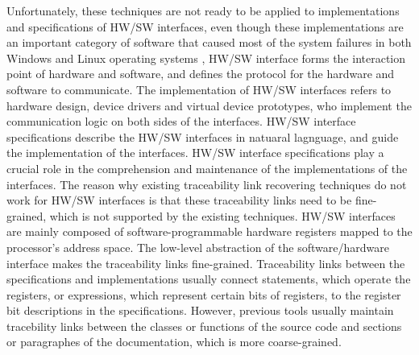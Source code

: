 Unfortunately, these techniques are not ready to be applied to implementations and specifications of HW/SW interfaces,
even though these implementations are an important category of software that caused most of the system failures in both Windows and Linux operating systems \cite{swift_os_2003} \cite{chou_os_2001},
HW/SW interface forms the interaction point of hardware and software,
and defines the protocol for the hardware and software to communicate.
The implementation of HW/SW interfaces refers to hardware design, device drivers and virtual device prototypes, who implement the communication logic on both sides of the interfaces.
HW/SW interface specifications describe the HW/SW interfaces in natuaral lagnguage,
and guide the implementation of the interfaces.
HW/SW interface specifications play a crucial role in the comprehension and maintenance of the implementations of the interfaces.
The reason why existing traceability link recovering techniques do not work for HW/SW interfaces is that these traceability links need to be fine-grained,
which is not supported by the existing techniques.
HW/SW interfaces are mainly composed of software-programmable hardware registers mapped to the processor's address space.
The low-level abstraction of the software/hardware interface makes the traceability links fine-grained.
Traceability links between the specifications and implementations usually connect statements, which operate the registers, or expressions, which represent certain bits of registers, to the register bit descriptions in the specifications. 
However, previous tools usually maintain tracebility links between the classes or functions of the source code and sections or paragraphes of the documentation, which is more coarse-grained.


